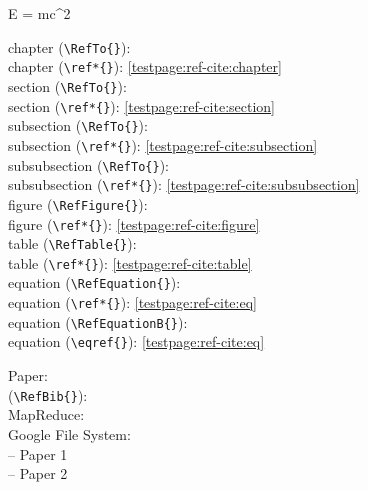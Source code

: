 E = mc^2\EquationEnd

\EndChapter


chapter (\verb|\RefTo{}|): \\
chapter (\verb|\ref*{}|): \ref*{testpage:ref-cite:chapter}\\

section (\verb|\RefTo{}|): \\
section (\verb|\ref*{}|): \ref*{testpage:ref-cite:section}\\

subsection (\verb|\RefTo{}|): \\
subsection (\verb|\ref*{}|): \ref*{testpage:ref-cite:subsection}\\

subsubsection (\verb|\RefTo{}|): \\
subsubsection (\verb|\ref*{}|): \ref*{testpage:ref-cite:subsubsection}\\

figure (\verb|\RefFigure{}|): \\
figure (\verb|\ref*{}|): \ref*{testpage:ref-cite:figure}\\

table (\verb|\RefTable{}|): \\
table (\verb|\ref*{}|): \ref*{testpage:ref-cite:table}\\

equation (\verb|\RefEquation{}|): \\
equation (\verb|\ref*{}|): \ref*{testpage:ref-cite:eq}\\

equation (\verb|\RefEquationB{}|): \\
equation (\verb|\eqref{}|): \eqref{testpage:ref-cite:eq}\\

\newpage

Paper:\\
(\verb|\RefBib{}|):\\
MapReduce: \\
Google File System:\\
-- Paper 1 \\
-- Paper 2 

